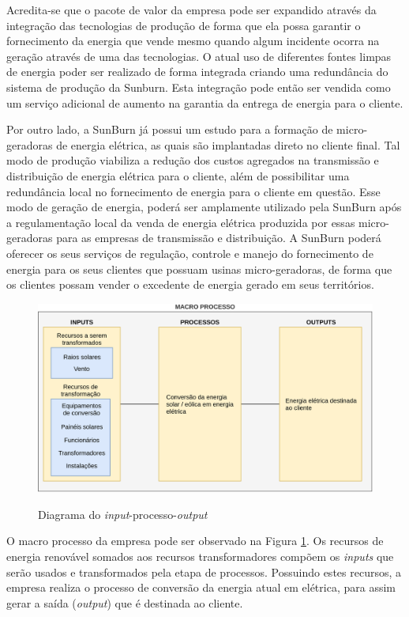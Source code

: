 Acredita-se que o pacote de valor da empresa pode ser expandido através da integração das tecnologias de produção de forma que ela possa garantir o fornecimento da energia que vende mesmo quando algum incidente ocorra na geração através de uma das tecnologias. O atual uso de diferentes fontes limpas de energia poder ser realizado de forma integrada criando uma redundância do sistema de produção da Sunburn. Esta integração pode então ser vendida como um serviço adicional de aumento na garantia da entrega de energia para o cliente.

Por outro lado, a SunBurn já possui um estudo para a formação de micro-geradoras de energia elétrica, as quais são implantadas direto no cliente final. Tal modo de produção viabiliza a redução dos custos agregados na transmissão e distribuição de energia elétrica para o cliente, além de possibilitar uma redundância local no fornecimento de energia para o cliente em questão. Esse modo de geração de energia, poderá ser amplamente utilizado pela SunBurn após a regulamentação local da venda de energia elétrica produzida por essas micro-geradoras para as empresas de transmissão e distribuição. A SunBurn poderá oferecer os seus serviços de regulação, controle e manejo do fornecimento de energia para os seus clientes que possuam usinas micro-geradoras, de forma que os clientes possam vender o excedente de energia gerado em seus territórios.

\begin{figure}[H]
    \caption{Diagrama do \textit{input}-processo-\textit{output}}
    \includegraphics[width = 1\textwidth]{images/diagram.png}
    \label{fig:gestao_operacoes_aplicacao_diagrama}
\end{figure}

O macro processo da empresa pode ser observado na Figura \ref{fig:gestao_operacoes_aplicacao_diagrama}. Os recursos de energia renovável somados aos recursos transformadores compõem os \textit{inputs} que serão usados e transformados pela etapa de processos. Possuindo estes recursos, a empresa realiza o processo de conversão da energia atual em elétrica, para assim gerar a saída (\textit{output}) que é destinada ao cliente.


